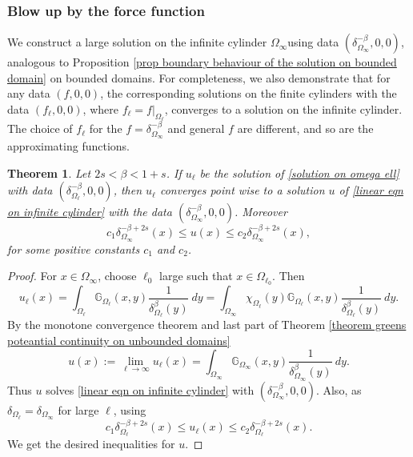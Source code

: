 \documentclass{amsart}
\newtheorem{theorem}{Theorem}[section]
\newcommand{\gk}[1]{\mathbb{G}_{#1}}
\begin{document}
\subsubsection{\textbf{Blow up by the force function}}\label{subsection_by force term}
We construct a large solution on the infinite cylinder $\Omega_{\infty}$using data $(\delta_{\Omega_{\infty}}^{-\beta},0,0)$, analogous to Proposition \ref{prop boundary behaviour of the solution on bounded domain} on bounded domains. For completeness, we also demonstrate that for any data $(f,0,0)$, the corresponding solutions on the finite cylinders with the data $(f_{\ell},0,0)$, where $f_{\ell}=f|_{\Omega_{\ell}}$, converges to a solution on the infinite cylinder. 
 The choice of $f_{\ell}$ for the $f=\delta_{\Omega_{\infty}}^{-\beta}$ and general $f$ are different, and so are the approximating functions.

\begin{theorem}
    Let $2s<\beta<1+s$. If $u_{\ell}$ be the solution of \eqref{solution on omega ell} with data $(\delta_{\Omega_{\ell}}^{-\beta},0,0)$, then $u_{\ell}$ converges point wise to a solution $u$ of \eqref{linear eqn on infinite cylinder} with the data $(\delta_{\Omega_{\infty}}^{-\beta},0,0)$. Moreover 
    \begin{equation*}
        c_{1}\delta_{\Omega_{\infty}}^{-\beta+2s}(x)\leq u(x)\leq c_{2}\delta_{\Omega_{\infty}}^{-\beta+2s}(x),
    \end{equation*}
for some positive constants $c_{1}$ and $c_{2}$.
\end{theorem}
\begin{proof}
  For $x\in \Omega_{\infty}$, choose $\ell_{0}$ large such that $x\in  \Omega_{\ell_{0}}$. Then
    \begin{equation*}
        u_{\ell}(x)=\int_{\Omega_{\ell}}\gk{\Omega_{\ell}}(x,y) \frac{1}{\delta_{\Omega_{\ell}}^{\beta}(y)}\ dy= \int_{\Omega_{\infty}}\chi_{\Omega_{\ell}}(y)\gk{\Omega_{\ell}}(x,y) \frac{1}{\delta_{\Omega_{\ell}}^{\beta}(y)}\ dy.
    \end{equation*}
    By the monotone convergence theorem and last part of Theorem \ref{theorem greens poteantial continuity on unbounded domains}
    \begin{equation*}
        u(x):=\lim_{\ell\to\infty}u_{\ell}(x)=\int_{\Omega_{\infty}}\gk{\Omega_{\infty}}(x,y) \frac{1}{\delta_{\Omega_{\infty}}^{\beta}(y)}\ dy.
    \end{equation*}
    Thus $u$ solves \eqref{linear eqn on infinite cylinder} with $(\delta_{\Omega_{\infty}}^{-\beta},0,0)$. Also, as $\delta_{\Omega_{\ell}}= \delta_{\Omega_{\infty}}$ for large $\ell$, using
    \begin{equation*}
        c_{1}\delta_{\Omega_{\ell}}^{-\beta+2s}(x)\leq u_{\ell}(x)\leq c_{2}\delta_{\Omega_{\ell}}^{-\beta+2s}(x).
    \end{equation*}
  We get the desired inequalities for $u$.
\end{proof}
\end{document}
